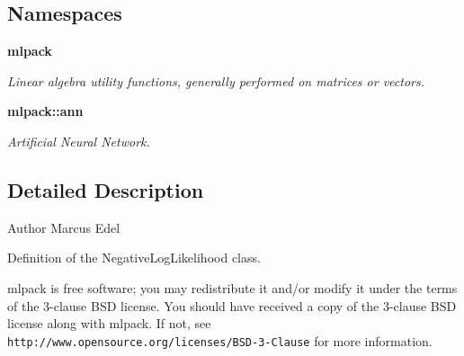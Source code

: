 \subsection*{Namespaces}
\begin{DoxyCompactItemize}
\item 
 {\bf mlpack}
\begin{DoxyCompactList}\small\item\em Linear algebra utility functions, generally performed on matrices or vectors. \end{DoxyCompactList}\item 
 {\bf mlpack\+::ann}
\begin{DoxyCompactList}\small\item\em Artificial Neural Network. \end{DoxyCompactList}\end{DoxyCompactItemize}


\subsection{Detailed Description}
\begin{DoxyAuthor}{Author}
Marcus Edel
\end{DoxyAuthor}
Definition of the Negative\+Log\+Likelihood class.

mlpack is free software; you may redistribute it and/or modify it under the terms of the 3-\/clause B\+SD license. You should have received a copy of the 3-\/clause B\+SD license along with mlpack. If not, see {\tt http\+://www.\+opensource.\+org/licenses/\+B\+S\+D-\/3-\/\+Clause} for more information. 
